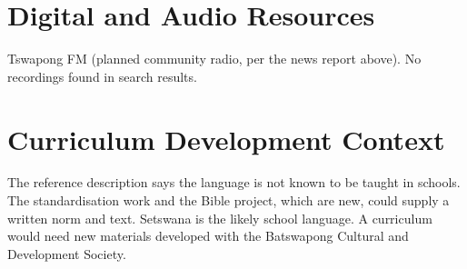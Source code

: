 \documentclass[12pt]{article}
\begin{document}
\section{Digital and Audio Resources}
Tswapong FM (planned community radio, per the news report above). No recordings found in search results.

\section{Curriculum Development Context}
The reference description says the language is not known to be taught in schools. The standardisation work and the Bible project, which are new, could supply a written norm and text. Setswana is the likely school language. A curriculum would need new materials developed with the Batswapong Cultural and Development Society.
\end{document}
